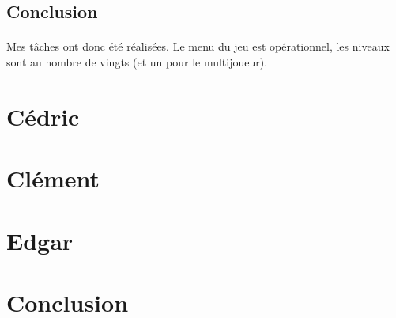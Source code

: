 \documentclass[titlepage, 13px, a4paper]{report}
\begin{document}
\subsection{Conclusion}
\paragraph{} \hspace{0pt}
Mes tâches ont donc été réalisées. Le menu du jeu est opérationnel, les niveaux
sont au nombre de vingts (et un pour le multijoueur). \\


\newpage
\section{Cédric}
\paragraph{} \hspace{0pt}


\newpage
\section{Clément}
\paragraph{} \hspace{0pt}


\newpage
\section{Edgar}
\paragraph{} \hspace{0pt}


\newpage
\section{Conclusion}
\paragraph{} \hspace{0pt}



\newpage

\end{document}
